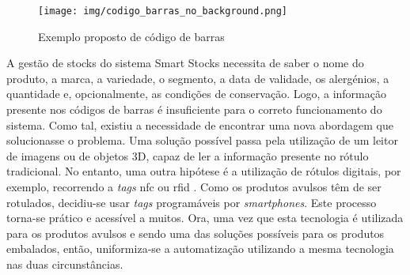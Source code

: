 \begin{figure}[H]
	\centering
	\texttt{[image: img/codigo\_barras\_no\_background.png]}
	\caption{Exemplo proposto de código de barras}
	\label{bar-code-example}
\end{figure}

A gestão de stocks do sistema Smart Stocks necessita de saber o nome do produto, a marca, a variedade, o segmento, a data de validade, os alergénios, a quantidade e, opcionalmente, as condições de conservação. Logo, a informação presente nos códigos de barras é insuficiente para o correto funcionamento do sistema. Como tal, existiu a necessidade de encontrar uma nova abordagem que solucionasse o problema. Uma solução possível passa pela utilização de um leitor de imagens ou de objetos 3D, capaz de ler a informação presente no rótulo tradicional. No entanto, uma outra hipótese é a utilização de rótulos digitais, por exemplo, recorrendo a \textit{tags} \acrfull{nfc} \cite{nfcforum:nfc} ou \acrfull{rfid} \cite{rfidinc:rfid}. 
Como os produtos avulsos têm de ser rotulados, decidiu-se usar \textit{tags} programáveis por \textit{smartphones}. Este processo torna-se prático e acessível a muitos. Ora, uma vez que esta tecnologia é utilizada para os produtos avulsos e sendo uma das soluções possíveis para os produtos embalados, então, uniformiza-se a automatização utilizando a mesma tecnologia nas duas circunstâncias.

